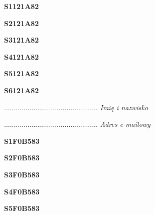 \begin{turn}{90}\huge \textbf{S1121A82}\end{turn}

\begin{turn}{90}\huge \textbf{S2121A82}\end{turn}

\begin{turn}{90}\huge \textbf{S3121A82}\end{turn}

\begin{turn}{90}\huge \textbf{S4121A82}\end{turn}

\begin{turn}{90}\huge \textbf{S5121A82}\end{turn}

\begin{turn}{90}\huge \textbf{S6121A82}\end{turn}

\begin{turn}{90}\begin{minipage}{\linewidth} \vspace{20mm} ................................................  \textit{Imię i nazwisko}\end{minipage}\end{turn}

\begin{turn}{90}\begin{minipage}{\linewidth} \vspace{20mm} ................................................  \textit{Adres e-mailowy}\end{minipage}\end{turn}

\begin{turn}{90}\huge \textbf{S1F0B583}\end{turn}

\begin{turn}{90}\huge \textbf{S2F0B583}\end{turn}

\begin{turn}{90}\huge \textbf{S3F0B583}\end{turn}

\begin{turn}{90}\huge \textbf{S4F0B583}\end{turn}

\begin{turn}{90}\huge \textbf{S5F0B583}\end{turn}

